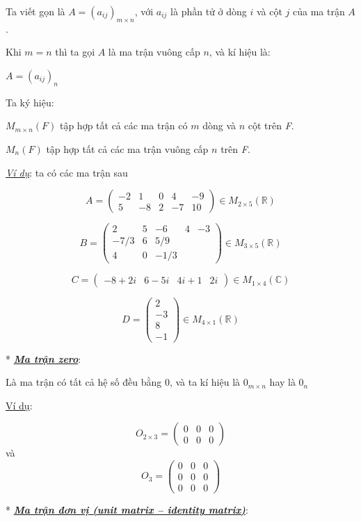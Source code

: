 \documentclass[12pt,a4paper]{article}
\let\ul\uline
\begin{document}
Ta viết gọn là $A = (a_{ij})_{m \times n}$, với
$a_{ij}$ là phần tử ở dòng
$i$ và cột
$j$ của ma trận
$A$.

Khi $m=n$ thì ta gọi
$A$ là ma trận vuông cấp
$n$, và kí hiệu là:

$A = (a_{ij})_{n}$

Ta ký hiệu:

$M_{m \times n}(F)$ tập hợp tất cả các ma trận có
$m$ dòng và
$n$ cột trên \emph{F}.

$M_n(F)$ tập hợp tất cả các ma trận vuông cấp
$n$ trên \emph{F}.

\emph{\ul{Ví dụ}}: ta có các ma trận sau

$$A = \begin{pmatrix} -2 & 1 & 0 & 4 & -9 \\ 5 & -8 & 2 & -7 & 10 \end{pmatrix} \in M_{2 \times 5}(\mathbb{R})$$

$$B = \begin{pmatrix} 2 & 5 & -6 & 4 & -3 \\ -7/3 & 6 & 5/9 \\ 4 & 0 & -1/3 \end{pmatrix} \in M_{3 \times 5}(\mathbb{R})$$

$$C = \begin{pmatrix} -8+2i & 6-5i & 4i+1 & 2i \end{pmatrix} \in M_{1 \times 4}(\mathbb{C})$$

$$D = \begin{pmatrix} 2 \\ -3 \\ 8 \\ -1 \end{pmatrix} \in M_{4 \times 1}(\mathbb{R})$$

* \emph{\textbf{\ul{Ma trận zero}}}:

Là ma trận có tất cả hệ số đều bằng 0, và ta kí hiệu là
$0_{m \times n}$ hay là
$0_n$

\ul{Ví dụ}:

$$O_{2 \times 3} = \begin{pmatrix} 0 & 0 & 0 \\ 0 & 0 & 0 \end{pmatrix}$$ và
$$O_3 = \begin{pmatrix} 0 & 0 & 0 \\ 0 & 0 & 0 \\ 0 & 0 & 0 \end{pmatrix}$$

* \emph{\textbf{\ul{Ma trận đơn vị (unit matrix -- identity matrix)}}}:
\end{document}
